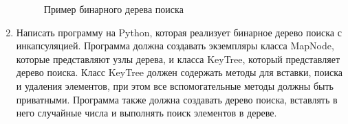 \begin{enumerate}
\begin{figure}[h]
\centering
{}
\caption{Пример бинарного дерева поиска}
\end{figure}

\item Написать программу на Python, которая реализует бинарное дерево поиска с инкапсуляцией. Программа должна создавать экземпляры класса MapNode, которые представляют узлы дерева, и класса KeyTree, который представляет дерево поиска. Класс KeyTree должен содержать методы для вставки, поиска и удаления элементов, при этом все вспомогательные методы должны быть приватными. Программа также должна создавать дерево поиска, вставлять в него случайные числа и выполнять поиск элементов в дереве.


\end{enumerate}
